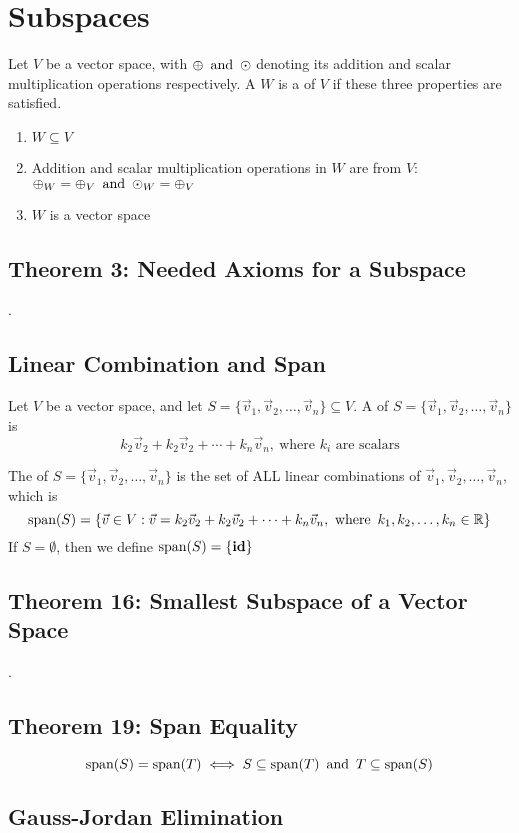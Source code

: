 \section{Subspaces}
Let $V$ be a vector space, with $\oplus \operatorname{~\text{and}~} \odot$ denoting its addition and scalar multiplication operations respectively. A  $W$ is a  of $V$ if these three properties are satisfied.
\begin{enumerate}
  \item $W \subseteq V$
  \item Addition and scalar multiplication operations in $W$ are  from $V$: $\oplus_W = \oplus_V \operatorname{~\text{and}~} \odot_W = \oplus_V$
  \item $W$ is a vector space
\end{enumerate}

\subsection*{Theorem 3: Needed Axioms for a Subspace}
.

\subsection*{Linear Combination and Span}
Let $V$ be a vector space, and let $S = \{\vec{v}_1, \vec{v}_2, \ldots, \vec{v}_n\} \subseteq V$. A  of $S = \{\vec{v}_1, \vec{v}_2, \ldots, \vec{v}_n\}$ is
\[
  k_2\vec{v}_2 + k_2\vec{v}_2 + \cdots + k_n\vec{v}_n,~\text{where $k_i$ are scalars}
\]

The  of $S = \{\vec{v}_1, \vec{v}_2, \ldots, \vec{v}_n\}$ is the set of ALL linear combinations of $\vec{v}_1, \vec{v}_2, \ldots, \vec{v}_n$, which is
\[
  \operatorname{\text{span}}(S) = \{\vec{v} \in V : \vec{v} = k_2\vec{v}_2 + k_2\vec{v}_2 + \cdots + k_n\vec{v}_n, \operatorname{~\text{where}~} k_1, k_2, \ldots, k_n \in \mathbb{R}\}
\]
If $S = \emptyset$, then we define $\operatorname{\text{span}}(S) = \{\operatorname{\textbf{id}}\}$

\subsection*{Theorem 16: Smallest Subspace of a Vector Space}
.

\subsection*{Theorem 19: Span Equality}
\[
  \operatorname{\text{span}}(S) = \operatorname{\text{span}}(T) \iff S \subseteq \operatorname{\text{span}}(T) \operatorname{~\text{and}~} T \subseteq \operatorname{\text{span}}(S)
\]

\subsection*{Gauss-Jordan Elimination}
